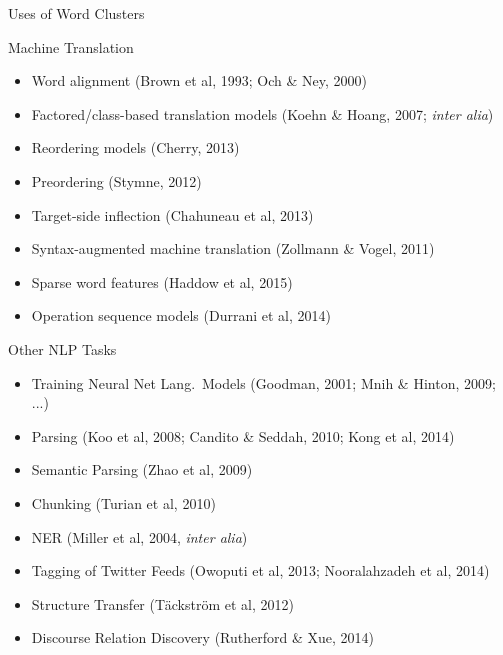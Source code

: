 \documentclass[xcolor=pdftex,x11names,table,hyperref]{beamer}
\begin{document}
\begin{frame}{Uses of Word Clusters}
\begin{footnotesize}
\begin{block}{Machine Translation}
	\begin{itemize}
		\itemsep-0.4em
		\item Word alignment {\tiny (Brown et al, 1993; Och \& Ney, 2000)} \nocite{brown-etal1993,och-ney2000}
	\item {\footnotesize Factored/class-based translation models} \nocite{koehn-hoang2007,wuebker-etal2013,mediani-etal2012} {\tiny (Koehn \& Hoang, 2007; {\it inter alia})} %
		\item Reordering models {\tiny (Cherry, 2013)} \nocite{cherry2013}
		\item Preordering {\tiny (Stymne, 2012)} \nocite{stymne2012}
		\item Target-side inflection {\tiny (Chahuneau et al, 2013)} \nocite{chahuneau-etal2013}
		\item Syntax-augmented machine translation {\tiny (Zollmann \& Vogel, 2011)} \nocite{zollmann-vogel2011}
		\item Sparse word features {\tiny (Haddow et al, 2015)} \nocite{haddow-etal2015}
		\item Operation sequence models {\tiny (Durrani et al, 2014)} \nocite{durrani-etal2014}
	\end{itemize}
\end{block}
\pause
\begin{block}{Other NLP Tasks}
	\begin{itemize}
		\itemsep-0.4em
		\item Training Neural Net Lang.\ Models {\tiny (Goodman, 2001; Mnih \& Hinton, 2009; ...)} \nocite{goodman2001a,mnih-hinton2009}
		\item Parsing {\tiny (Koo et al, 2008; Candito \& Seddah, 2010; Kong et al, 2014)} \nocite{koo-etal2008,candito-seddah2010,kong-etal2014}
		\item Semantic Parsing {\tiny (Zhao et al, 2009)} \nocite{zhao-etal2009}
		\item Chunking {\tiny (Turian et al, 2010)} \nocite{turian-etal2010}
		\item NER {\tiny (Miller et al, 2004, {\it inter alia})} \nocite{miller-etal2004,liang2005,ratinov-roth2009,turian-etal2010,ritter-etal2011}
		\item Tagging of Twitter Feeds {\tiny (Owoputi et al, 2013; Nooralahzadeh et al, 2014)} \nocite{owoputi-etal2013,nooralahzadeh-etal2014}
		\item Structure Transfer {\tiny (T\"{a}ckstr\"{o}m et al, 2012)} \nocite{tackstrom-etal2012}
		\item Discourse Relation Discovery {\tiny (Rutherford \& Xue, 2014)} \nocite{rutherford-xue2014}
	\end{itemize}
\end{block}
\end{footnotesize}
\end{frame}
\end{document}
